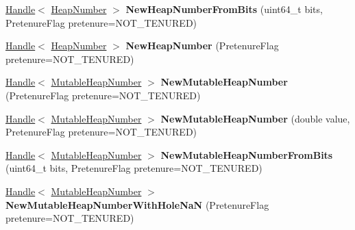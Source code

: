 \begin{DoxyCompactItemize}
\item 
\mbox{\label{classv8_1_1internal_1_1Factory_a6528cfc4d950ee8b454b40b894a21564}} 
\mbox{\hyperlink{classv8_1_1internal_1_1Handle}{Handle}}$<$ \mbox{\hyperlink{classv8_1_1internal_1_1HeapNumber}{Heap\+Number}} $>$ {\bfseries New\+Heap\+Number\+From\+Bits} (uint64\+\_\+t bits, Pretenure\+Flag pretenure=N\+O\+T\+\_\+\+T\+E\+N\+U\+R\+ED)
\item 
\mbox{\label{classv8_1_1internal_1_1Factory_aac0f690a424436f131ac656bd2de64f6}} 
\mbox{\hyperlink{classv8_1_1internal_1_1Handle}{Handle}}$<$ \mbox{\hyperlink{classv8_1_1internal_1_1HeapNumber}{Heap\+Number}} $>$ {\bfseries New\+Heap\+Number} (Pretenure\+Flag pretenure=N\+O\+T\+\_\+\+T\+E\+N\+U\+R\+ED)
\item 
\mbox{\label{classv8_1_1internal_1_1Factory_a9994ce629ee841f89c48055be6d4e47a}} 
\mbox{\hyperlink{classv8_1_1internal_1_1Handle}{Handle}}$<$ \mbox{\hyperlink{classv8_1_1internal_1_1MutableHeapNumber}{Mutable\+Heap\+Number}} $>$ {\bfseries New\+Mutable\+Heap\+Number} (Pretenure\+Flag pretenure=N\+O\+T\+\_\+\+T\+E\+N\+U\+R\+ED)
\item 
\mbox{\label{classv8_1_1internal_1_1Factory_a619e6e9447210a6cba45dcf09e66d4a2}} 
\mbox{\hyperlink{classv8_1_1internal_1_1Handle}{Handle}}$<$ \mbox{\hyperlink{classv8_1_1internal_1_1MutableHeapNumber}{Mutable\+Heap\+Number}} $>$ {\bfseries New\+Mutable\+Heap\+Number} (double value, Pretenure\+Flag pretenure=N\+O\+T\+\_\+\+T\+E\+N\+U\+R\+ED)
\item 
\mbox{\label{classv8_1_1internal_1_1Factory_a49b36e48af001c6f3982ba2e7474e7ad}} 
\mbox{\hyperlink{classv8_1_1internal_1_1Handle}{Handle}}$<$ \mbox{\hyperlink{classv8_1_1internal_1_1MutableHeapNumber}{Mutable\+Heap\+Number}} $>$ {\bfseries New\+Mutable\+Heap\+Number\+From\+Bits} (uint64\+\_\+t bits, Pretenure\+Flag pretenure=N\+O\+T\+\_\+\+T\+E\+N\+U\+R\+ED)
\item 
\mbox{\label{classv8_1_1internal_1_1Factory_a3593091881001b5d6c3b450af8b3648d}} 
\mbox{\hyperlink{classv8_1_1internal_1_1Handle}{Handle}}$<$ \mbox{\hyperlink{classv8_1_1internal_1_1MutableHeapNumber}{Mutable\+Heap\+Number}} $>$ {\bfseries New\+Mutable\+Heap\+Number\+With\+Hole\+NaN} (Pretenure\+Flag pretenure=N\+O\+T\+\_\+\+T\+E\+N\+U\+R\+ED)

\end{DoxyCompactItemize}
